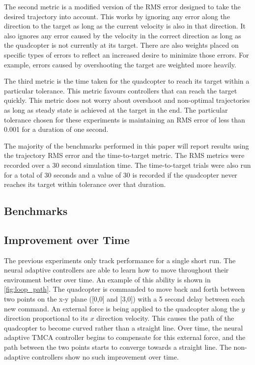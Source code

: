 \documentclass[letterpaper, 10 pt, conference]{ieeeconf}  %
\begin{document}
The second metric is a modified version of the RMS error designed to take the desired trajectory into account.
This works by ignoring any error along the direction to the target as long as the current velocity is also in that direction.
It also ignores any error caused by the velocity in the correct direction as long as the quadcopter is not currently at its target.
There are also weights placed on specific types of errors to reflect an increased desire to minimize those errors.
For example, errors caused by overshooting the target are weighted more heavily.

The third metric is the time taken for the quadcopter to reach its target within a particular tolerance. 
This metric favours controllers that can reach the target quickly.
This metric does not worry about overshoot and non-optimal trajectories as long as steady state is achieved at the target in the end.
The particular tolerance chosen for these experiments is maintaining an RMS error of less than 0.001 for a duration of one second.

The majority of the benchmarks performed in this paper will report results using the trajectory RMS error and the time-to-target metric.
The RMS metrics were recorded over a 30 second simulation time.
The time-to-target trials were also run for a total of 30 seconds and a value of 30 is recorded if the quadcopter never reaches its target within tolerance over that duration.

\subsection{Benchmarks}
\subsection{Improvement over Time}

The previous experiments only track performance for a single short run. 
The neural adaptive controllers are able to learn how to move throughout their environment better over time.
An example of this ability is shown in \ref{fig:loop_path}.
The quadcopter is commanded to move back and forth between two points on the x-y plane ([0,0] and [3,0]) with a 5 second delay between each new command.
An external force is being applied to the quadcopter along the $y$ direction proportional to its $x$ direction velocity.
This causes the path of the quadcopter to become curved rather than a straight line.
Over time, the neural adaptive TMCA controller begins to compensate for this external force, and the path between the two points starts to converge towards a straight line.
The non-adaptive controllers show no such improvement over time.
\end{document}
